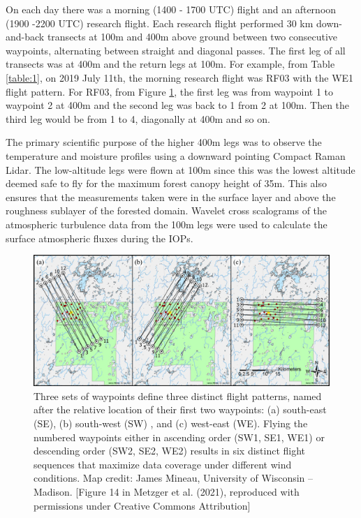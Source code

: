\documentclass[draft]{agujournal2019}
\begin{document}
On each day there was a morning (1400 - 1700 UTC) flight and an afternoon (1900 -2200 UTC) research flight.  Each research flight performed 30 km down-and-back transects  at 100m and 400m above ground between two consecutive waypoints, alternating between straight and diagonal passes. The first leg of all transects was at 400m and the return legs at 100m. For example, from Table \ref{table:1}, on 2019 July 11th, the morning research flight was RF03 with the WE1 flight pattern. For RF03, from Figure \ref{fig:way_points},  the first leg was from waypoint 1 to waypoint 2 at 400m and the second leg was back to 1 from 2 at 100m. Then the third leg would be from 1 to 4, diagonally at 400m and so on. 

The primary scientific purpose of the higher 400m legs was to observe the temperature and moisture profiles using a downward pointing Compact Raman Lidar. The low-altitude legs were flown at 100m since this was the  lowest altitude deemed safe to fly for the maximum forest canopy height of 35m. This also ensures that the measurements taken were in the surface layer and above the roughness sublayer of the forested domain. Wavelet cross scalograms of the atmospheric turbulence data from the 100m legs were used to calculate the surface atmospheric fluxes during the IOPs. 

\begin{figure}
 \noindent\includegraphics[width=\textwidth]{figures_main/way_points.png}
\caption{Three sets of waypoints define three distinct flight patterns, named after the relative location of their first two waypoints: (a) south-east (SE), (b) south-west (SW)  , and (c) west-east (WE). Flying the numbered waypoints either in ascending order (SW1, SE1, WE1) or descending order (SW2, SE2, WE2) results in six distinct flight sequences that maximize data coverage under different wind conditions. Map credit: James Mineau, University of Wisconsin – Madison. [Figure 14 in Metzger et al. (2021), reproduced with permissions under Creative Commons Attribution]}
\label{fig:way_points}
\end{figure}
\end{document}
